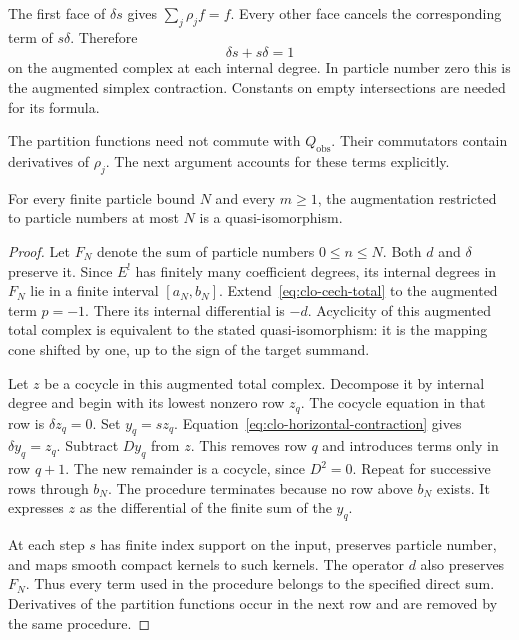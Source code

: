 The first face of $\delta s$ gives $\sum_j\rho_j f=f$.
Every other face cancels the corresponding term of $s\delta$.
Therefore
\begin{equation}\label{eq:clo-horizontal-contraction}
 \delta s+s\delta=1
\end{equation}
on the augmented complex at each internal degree.
In particle number zero this is the augmented simplex contraction.
Constants on empty intersections are needed for its formula.

The partition functions need not commute with $Q_{\mathrm{obs}}$.
Their commutators contain derivatives of $\rho_j$.
The next argument accounts for these terms explicitly.

\begin{lemma}\label{lem:clo-bounded-descent}
For every finite particle bound $N$ and every $m\geq1$, the augmentation
restricted to particle numbers at most $N$ is a quasi-isomorphism.
\end{lemma}

\begin{proof}
Let $F_N$ denote the sum of particle numbers $0\leq n\leq N$.
Both $d$ and $\delta$ preserve it.
Since $E^!$ has finitely many coefficient degrees, its internal degrees
in $F_N$ lie in a finite interval $[a_N,b_N]$.
Extend~\eqref{eq:clo-cech-total} to the augmented term $p=-1$.
There its internal differential is $-d$.
Acyclicity of this augmented total complex is equivalent to the stated
quasi-isomorphism: it is the mapping cone shifted by one, up to the
sign of the target summand.

Let $z$ be a cocycle in this augmented total complex.
Decompose it by internal degree and begin with its lowest nonzero row
$z_q$. The cocycle equation in that row is $\delta z_q=0$.
Set $y_q=sz_q$.
Equation~\eqref{eq:clo-horizontal-contraction} gives
$\delta y_q=z_q$.
Subtract $Dy_q$ from $z$.
This removes row $q$ and introduces terms only in row $q+1$.
The new remainder is a cocycle, since $D^2=0$.
Repeat for successive rows through $b_N$.
The procedure terminates because no row above $b_N$ exists.
It expresses $z$ as the differential of the finite sum of the $y_q$.

At each step $s$ has finite index support on the input, preserves
particle number, and maps smooth compact kernels to such kernels.
The operator $d$ also preserves $F_N$.
Thus every term used in the procedure belongs to the specified direct
sum. Derivatives of the partition functions occur in the next row and
are removed by the same procedure.
\end{proof}

